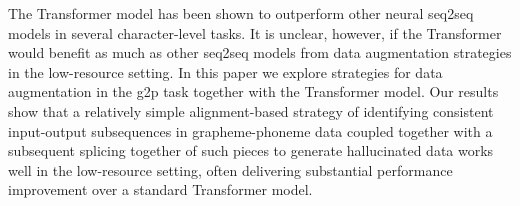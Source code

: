 The Transformer model has been shown to outperform other neural seq2seq models in several character-level tasks. It is unclear, however, if the Transformer would benefit as much as other seq2seq models from data augmentation strategies in the low-resource setting. In this paper we explore strategies for data augmentation in the g2p task together with the Transformer model.  Our results show that a relatively simple alignment-based strategy of identifying consistent input-output subsequences in grapheme-phoneme data coupled together with a subsequent splicing together of such pieces to generate hallucinated data works well in the low-resource setting, often delivering substantial performance improvement over a standard Transformer model.
